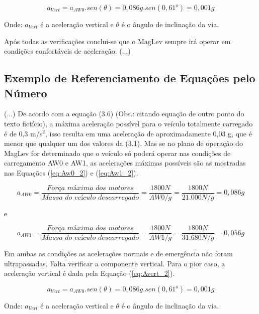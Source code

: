 \documentclass[
        oneside,      %
        english,			
        brazil			 
        ]{configcefetmglpd}
\begin{document}
\begin{equation}
	\label{eq:Avert}
	a_{Vert} = a_{AW0}.sen(\theta)=0,086g.sen(0,61^o)=0,001g
\end{equation}

Onde: $a_{Vert}$ é a aceleração vertical e $\theta$ é o ângulo de inclinação da via.

Após todas as verificações conclui-se que o MagLev sempre irá operar em condições confortáveis de aceleração. (...)

\subsection{Exemplo de Referenciamento de Equações pelo Número} \label{subsec:eq_ref_numero}

(...) De acordo com a equação (3.6) (Obs.: citando equação de outro ponto do texto fictício), a máxima aceleração possível para o veículo totalmente carregado é de 0,3 m/s$^2$, isso resulta em uma aceleração de aproximadamente 0,03 g, que é menor que qualquer um dos valores da (3.1). Mas se no plano de operação do MagLev for determinado que o veículo só poderá operar nas condições de carregamento AW0 e AW1, as acelerações máximas possíveis são as mostradas nas Equações (\ref{eq:Aw0_2}) e (\ref{eq:Aw1_2}).

\begin{equation}
	\label{eq:Aw0_2}
	a_{AW0} = \frac{\textit{Força~máxima~dos~motores}}{\textit{Massa~do~veículo~descarregado}} = \frac{1800N}{AW0/g}
	=\frac{1800N}{21.000N/g}=0,086g
\end{equation}

e

\begin{equation}
	\label{eq:Aw1_2}
	a_{AW1} = \frac{\textit{Força~máxima~dos~motores}}{\textit{Massa~do~veículo~descarregado}} = \frac{1800N}{AW1/g}
	=\frac{1800N}{31.680N/g}=0,056g
\end{equation}

Em ambas as condições as acelerações normais e de emergência não foram ultrapassadas. Falta verificar a componente vertical. Para o pior caso, a aceleração vertical é dada pela Equação (\ref{eq:Avert_2}).

\begin{equation}
	\label{eq:Avert_2}
	a_{Vert} = a_{AW0}.sen(\theta)=0,086g.sen(0,61^o)=0,001g
\end{equation}

Onde: $a_{Vert}$ é a aceleração vertical e $\theta$ é o ângulo de inclinação da via.
\end{document}
